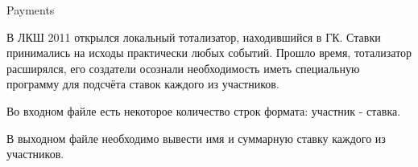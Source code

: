 ﻿Payments

В ЛКШ 2011 открылся локальный тотализатор, находившийся в ГК. Ставки принимались на исходы практически любых событий. Прошло время, тотализатор расширялся, его создатели осознали
необходимость иметь специальную программу для подсчёта ставок каждого из участников.


\InputFile
Во входном файле есть некоторое количество строк формата: участник - ставка.

\OutputFile
В выходном файле необходимо вывести имя и суммарную ставку каждого из участников.


		
